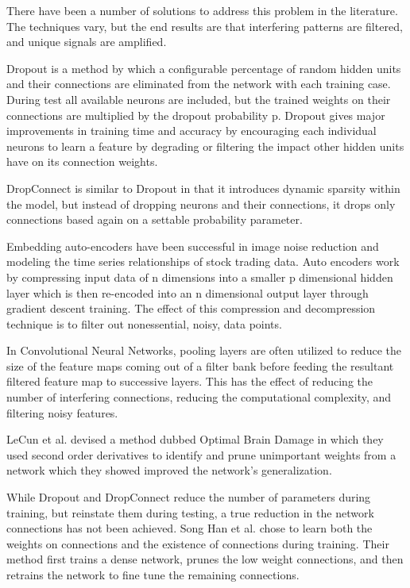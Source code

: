 \documentclass{llncs}
\begin{document}
There have been a number of solutions to address this problem in the literature.  The techniques vary, but the end results are that interfering patterns are filtered, and unique signals are amplified.

Dropout is a method by which a configurable percentage of random hidden units and their connections are eliminated from the network with each training case.  During test all available neurons are included, but the trained weights on their connections are multiplied by the dropout probability p.  Dropout gives major improvements in training time and accuracy by encouraging each individual neurons to learn a feature by degrading or filtering the impact other hidden units have on its connection weights.

DropConnect is similar to Dropout in that it introduces dynamic sparsity within the model, but instead of dropping neurons and their connections, it drops only connections based again on a settable probability parameter.

Embedding auto-encoders have been successful in image noise reduction and modeling the time series relationships of stock trading data.  Auto encoders work by compressing input data of n dimensions into a smaller p dimensional hidden layer which is then re-encoded into an n dimensional output layer through gradient descent training.  The effect of this compression and decompression technique is to filter out nonessential, noisy, data points.

In Convolutional Neural Networks,  pooling layers are often utilized to reduce the size of the feature maps coming out of a filter bank before feeding the resultant filtered feature map to successive layers.  This has the effect of reducing the number of interfering connections, reducing the computational complexity, and filtering noisy features.

LeCun et al. devised a method dubbed Optimal Brain Damage in which they used second order derivatives to identify and prune unimportant weights from a network which they showed improved the network's generalization.

While Dropout and DropConnect reduce the number of parameters during training, but reinstate them during testing, a true reduction in the network connections has not been achieved.   Song Han et al. chose to learn both the weights on connections and the existence of connections during training. Their method first trains a dense network, prunes the low weight connections, and then retrains the network to fine tune the remaining connections.
\end{document}
